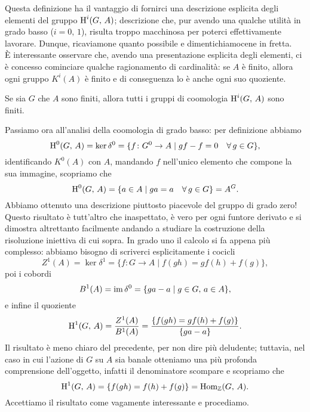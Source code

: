 Questa definizione ha il vantaggio di fornirci una descrizione esplicita degli elementi del gruppo $ \operatorname{H}^i(G, \, A) $; descrizione che, pur avendo una qualche utilità in grado basso ($ i = 0,\, 1 $), risulta troppo macchinosa per poterci effettivamente lavorare. Dunque, ricaviamone quanto possibile e dimentichiamocene in fretta. \\

È interessante osservare che, avendo una presentazione esplicita degli elementi, ci è concesso cominciare qualche ragionamento di cardinalità: se $ A $ è finito, allora ogni gruppo $ K^i(A) $ è finito e di conseguenza lo è anche ogni suo quoziente.
\begin{lemma}%
	Se sia $ G $ che $ A $ sono finiti, allora tutti i gruppi di coomologia $ \operatorname{H}^i(G, \, A) $ sono finiti.
\end{lemma}

Passiamo ora all'analisi della coomologia di grado basso: per definizione abbiamo
$$  \operatorname{H}^0(G, \, A) = \ker \delta^0 = \{ f \colon G^0 \to A \mid gf-f = 0 \quad \forall \, g \in G \},  $$
identificando $ K^0(A) $ con $ A $, mandando $ f $ nell'unico elemento che compone la sua immagine, scopriamo che
\[ \operatorname{H}^0(G, \, A) = \{ a \in A \mid ga = a \quad \forall \, g \in G \} = A^G. \]
Abbiamo ottenuto una descrizione piuttosto piacevole del gruppo di grado zero! Questo risultato è tutt'altro che inaspettato, è vero per ogni funtore derivato e si dimostra altrettanto facilmente andando a studiare la costruzione della risoluzione iniettiva di cui sopra. In grado uno il calcolo si fa appena più complesso: abbiamo bisogno di scriverci esplicitamente i cocicli
\[ Z^1(A) = \ker \delta^1 = \{ f \colon G \to A \mid f(gh) = gf(h) + f(g) \}, \]
poi i cobordi
\[ B^1(A) = \operatorname{im} \delta^0 = \{ ga - a \mid g \in G, \, a \in A  \}, \]
e infine il quoziente
\[ \operatorname{H}^1(G, \, A) = \frac{Z^1(A)}{B^1(A)} = \frac{\{ f(gh) = gf(h) + f(g) \}}{\{ ga - a\}}. \]
Il risultato è meno chiaro del precedente, per non dire più deludente; tuttavia, nel caso in cui l'azione di $ G $ su $ A $ sia banale otteniamo una più profonda comprensione dell'oggetto, infatti il denominatore scompare e scopriamo che
\[ \operatorname{H}^1(G, \, A) = \{ f(gh) = f(h) + f(g) \} = \operatorname{Hom}_{\mathbb{Z}}(G, \, A). \]
Accettiamo il risultato come vagamente interessante e procediamo.


